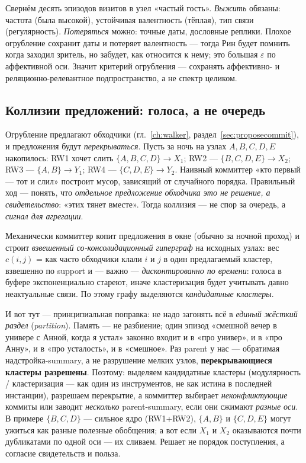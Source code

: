 \begin{workedbox}
Свернём десять эпизодов визитов в узел «частый гость». \emph{Выжить} обязаны:
частота (была высокой), устойчивая валентность (тёплая), тип связи
(регулярность). \emph{Потеряться} можно: точные даты, дословные реплики.
Плохое огрубление сохранит даты и потеряет валентность --- тогда Рин будет
помнить когда заходил зритель, но забудет, как относится к нему; это большая
$\varepsilon$ по аффективной оси. Значит критерий огрубления --- сохранять
аффективно- и реляционно-релевантное подпространство, а не спектр целиком.
\end{workedbox}

\subsection{Коллизии предложений: голоса, а не очередь}
\label{sec:consolidation-collisions}

Огрубление предлагают обходчики (гл.~\ref{ch:walker},
раздел~\ref{sec:proposecommit}), и предложения будут \emph{перекрываться}.
Пусть за ночь на узлах $A, B, C, D, E$ накопилось: RW1 хочет слить
$\{A, B, C, D\} \to X_1$; RW2 --- $\{B, C, D, E\} \to X_2$; RW3 ---
$\{A, B\} \to Y_1$; RW4 --- $\{C, D, E\} \to Y_2$. Наивный коммиттер
«кто первый --- тот и слил» построит мусор, зависящий от случайного
порядка. Правильный ход --- понять, что \emph{отдельное предложение обходчика
это не решение, а свидетельство}: «этих тянет вместе». Тогда коллизия ---
не спор за очередь, а \emph{сигнал для агрегации}.

Механически коммиттер копит предложения в окне (обычно за ночной проход) и
строит \emph{взвешенный со-консолидационный гиперграф} на исходных узлах: вес
$c(i,j)$ = как часто обходчики клали $i$ и $j$ в один предлагаемый кластер,
взвешенно по support и --- важно --- \emph{дисконтированно по времени}: голоса
в буфере экспоненциально стареют, иначе кластеризация будет учитывать давно
неактуальные связи. По этому графу выделяются \emph{кандидатные кластеры}.

И вот тут --- принципиальная поправка: не надо загонять всё в \emph{единый
жёсткий раздел} (\textit{partition}). Память --- не разбиение; один эпизод
«смешной вечер в универе с Анной, когда я устал» законно входит и в «про
универ», и в «про Анну», и в «про усталость», и в «смешное». Раз parent у нас
--- обратимая надстройка-summary, а не разрушение мелких узлов,
\textbf{перекрывающиеся кластеры разрешены}. Поэтому: выделяем кандидатные
кластеры (модулярность / кластеризация --- как один из инструментов, не как
истина в последней инстанции), разрешаем перекрытие, а коммиттер выбирает
\emph{неконфликтующие} коммиты или заводит \emph{несколько} parent-summary,
если они сжимают \emph{разные оси}. В примере $\{B, C, D\}$ --- сильное ядро
(RW1+RW2), $\{A, B\}$ и $\{C, D, E\}$ могут ужиться как разные полезные
обобщения; а вот если $X_1$ и $X_2$ оказываются почти дубликатами по одной
оси --- их сливаем. Решает не порядок поступления, а согласие свидетельств и
польза.

